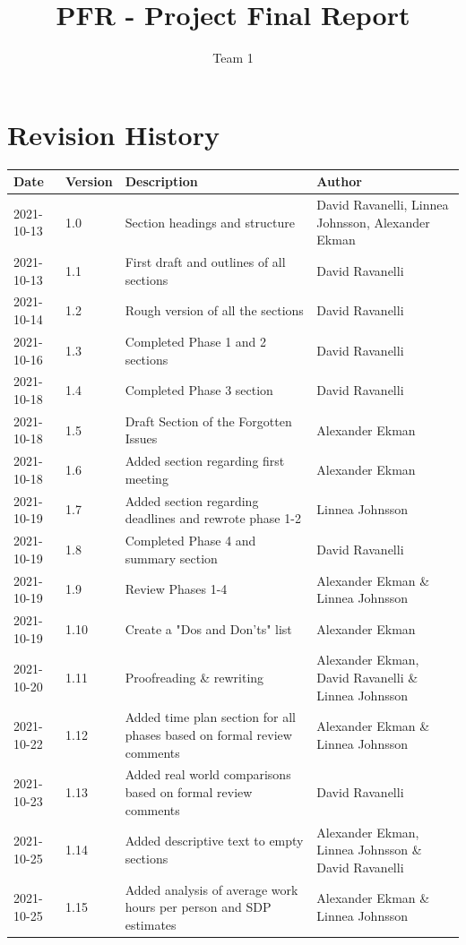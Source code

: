\documentclass{article}
\title{PFR - Project Final Report}
\author{Team 1}
\begin{document}

\date{}
\maketitle
\thispagestyle{fancy}
\newpage

\section*{Revision History}
\begin{table}[h]
    \centering
    \begin{tabular}{|l|l|p{55mm}|p{35mm}|}
    \hline
    Date & Version & Description & Author \\ 
    \hline\hline 
    2021-10-13 & 1.0 & Section headings and structure & David Ravanelli, Linnea Johnsson, Alexander Ekman  \\
    \hline
    2021-10-13 & 1.1 & First draft and outlines of all sections & David Ravanelli  \\
    \hline
    2021-10-14 & 1.2 & Rough version of all the sections & David Ravanelli \\
    \hline
    2021-10-16 & 1.3 & Completed Phase 1 and 2 sections & David Ravanelli \\
    \hline
    2021-10-18 & 1.4 & Completed Phase 3 section & David Ravanelli \\
    \hline
    2021-10-18 & 1.5 & Draft Section of the Forgotten Issues & Alexander Ekman \\
    \hline
    2021-10-18 & 1.6 & Added section regarding first meeting & Alexander Ekman \\
    \hline
    2021-10-19 & 1.7 & Added section regarding deadlines and rewrote phase 1-2 & Linnea Johnsson \\
    \hline
    2021-10-19 & 1.8 & Completed Phase 4 and summary section & David Ravanelli \\
    \hline
    2021-10-19 & 1.9 & Review Phases 1-4 & Alexander Ekman \& Linnea Johnsson \\
    \hline
    2021-10-19 & 1.10 & Create a "Dos and Don'ts" list & Alexander Ekman \\
    \hline
    2021-10-20 & 1.11 & Proofreading \& rewriting & Alexander Ekman, David Ravanelli \& Linnea Johnsson \\
    \hline
    2021-10-22 & 1.12 & Added time plan section for all phases based on formal review comments & Alexander Ekman \& Linnea Johnsson \\
    \hline
    2021-10-23 & 1.13 & Added real world comparisons based on formal review comments & David Ravanelli\\
    \hline
    2021-10-25 & 1.14 & Added descriptive text to empty sections & Alexander Ekman, Linnea Johnsson \& David Ravanelli \\
    \hline
    2021-10-25 & 1.15 & Added analysis of average work hours per person and SDP estimates & Alexander Ekman \& Linnea Johnsson \\
    \hline
    \end{tabular}
    \label{tab:history}
\end{table}
\newpage
\end{document}
